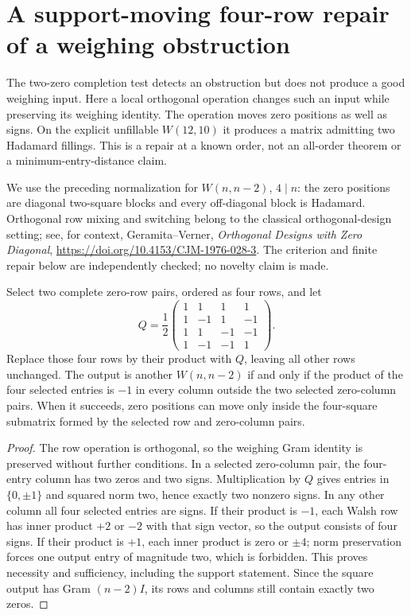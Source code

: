 \section{A support-moving four-row repair of a weighing obstruction}
\label{sec:weighing-switch-repair}

The two-zero completion test detects an obstruction but does not
produce a good weighing input. Here a local orthogonal operation
changes such an input while preserving its weighing identity.
The operation moves zero positions as well as signs. On the explicit
unfillable $W(12,10)$ it produces a matrix admitting two Hadamard
fillings. This is a repair at a known order, not an all-order theorem
or a minimum-entry-distance claim.

We use the preceding normalization for $W(n,n-2)$, $4\mid n$:
the zero positions are diagonal two-square blocks and every
off-diagonal block is Hadamard. Orthogonal row mixing and switching
belong to the classical orthogonal-design setting; see, for context,
Geramita--Verner, \emph{Orthogonal Designs with Zero Diagonal},
\url{https://doi.org/10.4153/CJM-1976-028-3}.
The criterion and finite repair below are independently checked;
no novelty claim is made.

\begin{theorem}
Select two complete zero-row pairs, ordered as four rows, and let
\[
 Q=\frac12\begin{pmatrix}
1&1&1&1\\1&-1&1&-1\\1&1&-1&-1\\1&-1&-1&1
\end{pmatrix}.
\]
Replace those four rows by their product with $Q$, leaving all
other rows unchanged. The output is another $W(n,n-2)$ if and
only if the product of the four selected entries is $-1$ in every
column outside the two selected zero-column pairs.
When it succeeds, zero positions can move only inside the four-square
submatrix formed by the selected row and zero-column pairs.
\end{theorem}
\begin{proof}
The row operation is orthogonal, so the weighing Gram identity is
preserved without further conditions. In a selected zero-column pair,
the four-entry column has two zeros and two signs. Multiplication
by $Q$ gives entries in $\{0,\pm1\}$ and squared norm two, hence
exactly two nonzero signs. In any other column all four selected
entries are signs. If their product is $-1$, each Walsh row has
inner product $+2$ or $-2$ with that sign vector, so the output
consists of four signs. If their product is $+1$, each inner product
is zero or $\pm4$; norm preservation forces one output entry of
magnitude two, which is forbidden. This proves necessity and
sufficiency, including the support statement. Since the square output
has Gram $(n-2)I$, its rows and columns still contain exactly two zeros.
\end{proof}

